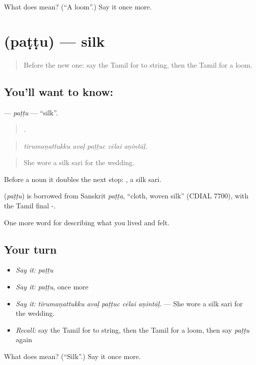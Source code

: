\begin{tcolorbox}[breakable,colback=teal!4,colframe=teal!35!black,title={Before you move on}]
What does  mean? (\textquotedblleft{}A loom\textquotedblright{}.) Say it once more.
\end{tcolorbox}
\section[\texorpdfstring{\ta{பட்டு} (paṭṭu)}{பட்டு (paṭṭu)}]{ (paṭṭu) — silk}

\label{lesson:TA-C538-pattu}



\begin{quote}
Before the new one: say the Tamil for to string, then the Tamil for a loom.
\end{quote}

\subsection*{You'll want to know: }
\textbf{} — \emph{paṭṭu} — \textquotedblleft{}silk\textquotedblright{}.

\begin{quote}
    .
\end{quote}

\begin{quote}
\emph{tirumaṇattukku avaḷ paṭṭuc cēlai aṇintāḷ.}
\end{quote}

\begin{quote}
She wore a silk sari for the wedding.
\end{quote}

Before a noun it doubles the next stop:  , a silk sari.

\begin{cousinweb}
\textbf{} (\emph{paṭṭu}) is borrowed from Sanskrit \emph{paṭṭa}, \textquotedblleft{}cloth, woven silk\textquotedblright{} (CDIAL 7700), with the Tamil final -.
\end{cousinweb}

\begin{grammarlens}[title={What you've built}]
One more word for describing what you lived and felt.
\end{grammarlens}

\subsection*{Your turn}
\begin{itemize}
\raggedright
  \item \emph{Say it:} \emph{paṭṭu}
  \item \emph{Say it:} \emph{paṭṭu}, once more
  \item \emph{Say it:} \emph{tirumaṇattukku avaḷ paṭṭuc cēlai aṇintāḷ.} — She wore a silk sari for the wedding.
  \item \emph{Recall:} say the Tamil for to string, then the Tamil for a loom, then say \emph{paṭṭu} again
\end{itemize}

\begin{tcolorbox}[breakable,colback=teal!4,colframe=teal!35!black,title={Before you move on}]
What does  mean? (\textquotedblleft{}Silk\textquotedblright{}.) Say it once more.
\end{tcolorbox}

